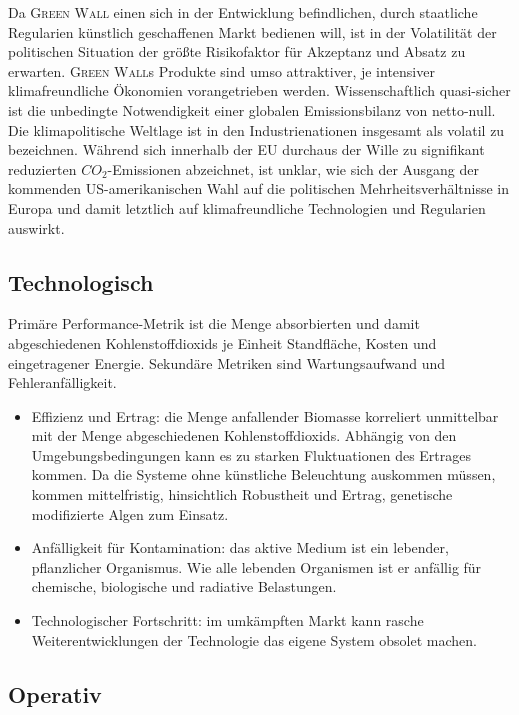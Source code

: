 Da \textsc{Green Wall} einen sich in der Entwicklung befindlichen, durch staatliche Regularien künstlich geschaffenen Markt bedienen will, ist in der Volatilität der politischen Situation der größte Risikofaktor für Akzeptanz und Absatz zu erwarten.
\textsc{Green Wall}s Produkte sind umso attraktiver, je intensiver klimafreundliche Ökonomien vorangetrieben werden.
Wissenschaftlich quasi-sicher ist die unbedingte Notwendigkeit einer globalen Emissionsbilanz von netto-null.
Die klimapolitische Weltlage ist in den Industrienationen insgesamt als volatil zu bezeichnen.
Während sich innerhalb der EU durchaus der Wille zu signifikant reduzierten \(CO_2\)-Emissionen abzeichnet, ist unklar, wie sich der Ausgang der kommenden US-amerikanischen Wahl auf die politischen Mehrheitsverhältnisse in Europa und damit letztlich auf klimafreundliche Technologien und Regularien auswirkt.

\subsection{Technologisch}

Primäre Performance-Metrik ist die Menge absorbierten und damit abgeschiedenen Kohlenstoffdioxids je Einheit Standfläche, Kosten und eingetragener Energie.
Sekundäre Metriken sind Wartungsaufwand und Fehleranfälligkeit.
\begin{itemize}
    \item Effizienz und Ertrag: die Menge anfallender Biomasse korreliert unmittelbar mit der Menge abgeschiedenen Kohlenstoffdioxids.
          Abhängig von den Umgebungsbedingungen kann es zu starken Fluktuationen des Ertrages kommen.
          Da die Systeme ohne künstliche Beleuchtung auskommen müssen, kommen mittelfristig, hinsichtlich Robustheit und Ertrag, genetische modifizierte Algen zum Einsatz.
    \item Anfälligkeit für Kontamination: das aktive Medium ist ein lebender, pflanzlicher Organismus. Wie alle lebenden Organismen ist er anfällig für chemische, biologische und radiative Belastungen.
    \item Technologischer Fortschritt: im umkämpften Markt kann rasche Weiterentwicklungen der Technologie das eigene System obsolet machen.
\end{itemize}

\subsection{Operativ}

